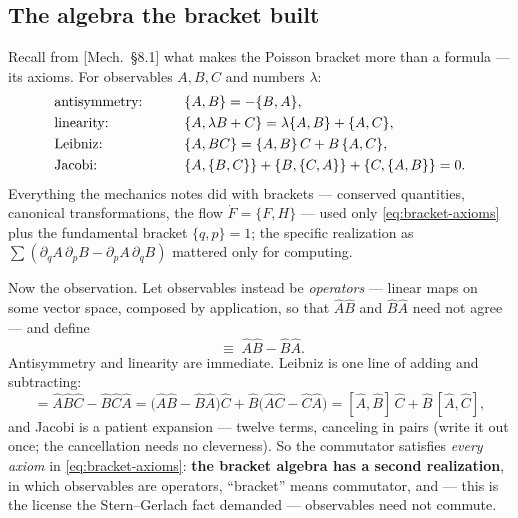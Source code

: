 \documentclass[11pt]{article}
\theoremstyle{plain}
\theoremstyle{definition}
\theoremstyle{remark}
\newcommand{\op}[1]{\hat{#1}}
\begin{document}
\subsection{The algebra the bracket built}
\label{sec:bracket-algebra}

Recall from [Mech.\ \S8.1] what makes the Poisson bracket more than a
formula --- its axioms. For observables $A, B, C$ and numbers
$\lambda$:
\begin{alignat}{2}
  &\text{antisymmetry:} \qquad && \{A, B\} = -\{B, A\},
  \notag\\
  &\text{linearity:} && \{A, \lambda B + C\}
    = \lambda\{A, B\} + \{A, C\},
  \notag\\
  &\text{Leibniz:} && \{A, BC\} = \{A, B\}\,C + B\,\{A, C\},
  \label{eq:bracket-axioms}\\
  &\text{Jacobi:} && \{A,\{B,C\}\} + \{B,\{C,A\}\} + \{C,\{A,B\}\}
    = 0.
  \notag
\end{alignat}
Everything the mechanics notes did with brackets --- conserved
quantities, canonical transformations, the flow $\dot F = \{F,H\}$
--- used only \eqref{eq:bracket-axioms} plus the fundamental bracket
$\{q, p\} = 1$; the specific realization as
$\sum(\partial_q A\,\partial_p B - \partial_p A\,\partial_q B)$
mattered only for computing.

Now the observation. Let observables instead be \emph{operators} ---
linear maps on some vector space, composed by application, so that
$\op A\op B$ and $\op B\op A$ need not agree --- and define
\begin{equation}
  [\op A, \op B] \;\equiv\; \op A\op B - \op B\op A .
\end{equation}
Antisymmetry and linearity are immediate. Leibniz is one line of
adding and subtracting:
\begin{equation}
  [\op A, \op B\op C]
  = \op A\op B\op C - \op B\op C\op A
  = \bigl(\op A\op B - \op B\op A\bigr)\op C
    + \op B\bigl(\op A\op C - \op C\op A\bigr)
  = [\op A, \op B]\,\op C + \op B\,[\op A, \op C],
  \label{eq:commutator-leibniz}
\end{equation}
and Jacobi is a patient expansion --- twelve terms, canceling in
pairs (write it out once; the cancellation needs no cleverness).
So the commutator satisfies \emph{every axiom} in
\eqref{eq:bracket-axioms}: \textbf{the bracket algebra has a second
realization}, in which observables are operators, ``bracket'' means
commutator, and --- this is the license the Stern--Gerlach fact
demanded --- observables need not commute.
\end{document}
